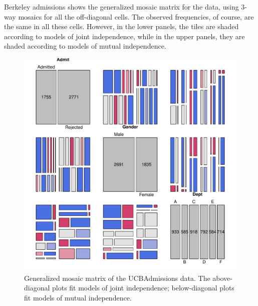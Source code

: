 \documentclass[11pt]{book}
\renewenvironment{knitrout}{\small\renewcommand{\baselinestretch}{.85}}{} %
\begin{document}
\begin{Example}[berkeley4b]{Berkeley admissions}
 shows the generalized mosaic matrix for the 
data, using 3-way mosaics for all the off-diagonal cells.
The observed frequencies, of course, are the same in all these cells.
However, in the lower panels, the tiles are shaded according to models of
joint independence, while in the upper panels, they are shaded according to
models of mutual independence.
\begin{knitrout}
\color{fgcolor}\begin{kframe}
\begin{alltt}
       \hlstd{=} \hlstd{(} \hlstd{=} \hlstd{,} \hlstd{=}\hlstd{),}
       \hlstd{=} \hlstd{(} \hlstd{=} \hlstd{,} \hlstd{=}\hlstd{),}
      \hlstd{=}\hlstd{)}
\end{alltt}
\end{kframe}\begin{figure}[!htb]


\centerline{\includegraphics[width=.8\textwidth]{ch05/fig/berk-pairs2} }

\caption[Generalized mosaic matrix of the UCBAdmissions data]{Generalized mosaic matrix of the UCBAdmissions data. The above-diagonal plots fit models of joint independence; below-diagonal plots fit models of mutual independence.\label{fig:berk-pairs2}}
\end{figure}



\end{knitrout}
\end{Example}
\end{document}
